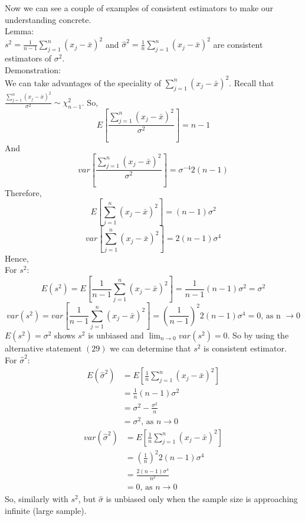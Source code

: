 \documentclass[12pt ]{article}
\begin{document}
\color{blue}
Now we can see a couple of examples of consistent estimators to make our understanding concrete.\\

Lemma:\\
$s^2 = \frac{1}{n-1} \sum_{j=1}^{n} (x_{j} - \bar{x})^2$ and $\hat{\sigma}^2 = \frac{1}{n} \sum_{j=1}^{n} (x_{j} - \bar{x})^2$ are consistent estimators of $\sigma^2$. \\

Demonstration: \\
We can take advantages of the speciality of $\sum_{j=1}^{n} (x_{j} - \bar{x})^2$. Recall that $\frac{\sum_{j=1}^{n} (x_{j} - \bar{x})^2}{\sigma^2} \sim \chi_{n-1}^{2}$. So,
\begin{equation*}
E[\frac{\sum_{j=1}^{n} (x_{j} - \bar{x})^2}{\sigma^2}] = n - 1
\end{equation*}
And
\begin{equation*}
var[\frac{\sum_{j=1}^{n} (x_{j} - \bar{x})^2}{\sigma^2}] = \sigma^{-4} 2(n-1)
\end{equation*}
Therefore,
\begin{equation*}
E[\sum_{j=1}^{n} (x_{j} - \bar{x})^2] = (n - 1)\sigma^2
\end{equation*}
\begin{equation*}
var[\sum_{j=1}^{n} (x_{j} - \bar{x})^2] = 2(n - 1)\sigma^4
\end{equation*}
Hence, \\
For $s^2$:
\begin{equation*}
E(s^2) = E[\frac{1}{n-1}\sum_{j=1}^{n} (x_{j} - \bar{x})^2] = \frac{1}{n-1} (n - 1)\sigma^2 = \sigma^2
\end{equation*}
\begin{equation*}
var(s^2) = var[\frac{1}{n-1}\sum_{j=1}^{n} (x_{j} - \bar{x})^2] = (\frac{1}{n-1})^2 2(n - 1)\sigma^4 = 0 \text{,  as n $\rightarrow 0$}
\end{equation*}
$E(s^2) = \sigma^2$ shows $s^2$ is unbiased and $\lim_{n\rightarrow 0}var(s^2) = 0$. So by using the alternative statement $(29)$ we can determine that $s^2$ is consistent estimator. \\
For $\hat{\sigma}^2$:
\begin{align*}
E(\hat{\sigma}^2) &= E[\frac{1}{n}\sum_{j=1}^{n} (x_{j} - \bar{x})^2] \\
&= \frac{1}{n} (n - 1)\sigma^2 \\
&= \sigma^2 - \frac{\sigma^2}{n} \\
&= \sigma^2 \text{,  as $n\rightarrow 0$}
\end{align*}
\begin{align*}
var(\hat{\sigma}^2) &= E[\frac{1}{n}\sum_{j=1}^{n} (x_{j} - \bar{x})^2] \\
&= (\frac{1}{n})^2 2(n - 1)\sigma^4\\
&= \frac{2(n-1)\sigma^4}{n^2} \\
&= 0 \text{,  as $n\rightarrow 0$}
\end{align*}
So, similarly with $s^2$, but $\hat{\sigma}$ is unbiased only when the sample size is approaching infinite (large sample).
\color{black}
\end{document}
